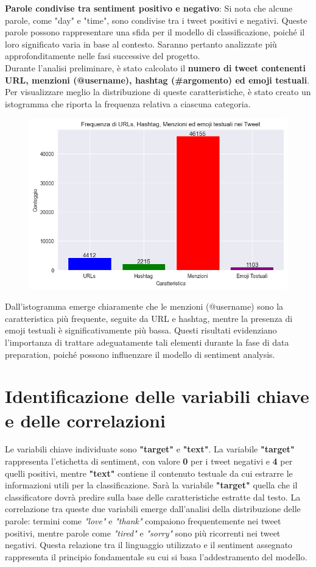 \documentclass[12pt,a4paper]{report} %
\begin{document}
\textbf{Parole condivise tra sentiment positivo e negativo}: Si nota che alcune parole, come "day" e "time", sono condivise tra i tweet positivi e negativi. Queste parole possono rappresentare una sfida per il modello di classificazione, poiché il loro significato varia in base al contesto. Saranno pertanto analizzate più approfonditamente nelle fasi successive del progetto.
\\Durante l'analisi preliminare, è stato calcolato il \textbf{n}\textbf{umero di tweet contenenti URL, menzioni (@username), hashtag (\#argomento) ed emoji testuali}. Per visualizzare meglio la distribuzione di queste caratteristiche, è stato creato un istogramma che riporta la frequenza relativa a ciascuna categoria. 
\begin{figure}[H]
    \centering
    \includegraphics[width=0.75\linewidth]{immagini/frequenza_tweet_understanding.png}
    \label{fig:enter-label}
\end{figure}
Dall'istogramma emerge chiaramente che le menzioni (@username) sono la caratteristica più frequente, seguite da URL e hashtag, mentre la presenza di emoji testuali è significativamente più bassa. Questi risultati evidenziano l'importanza di trattare adeguatamente tali elementi durante la fase di data preparation, poiché possono influenzare il modello di sentiment analysis. 
\section{Identificazione delle variabili chiave e delle correlazioni}
Le variabili chiave individuate sono \textbf{"target"} e \textbf{"text"}. La variabile \textbf{"target"} rappresenta l’etichetta di sentiment, con valore \textbf{0} per i tweet negativi e \textbf{4} per quelli positivi, mentre \textbf{"text"} contiene il contenuto testuale da cui estrarre le informazioni utili per la classificazione. Sarà la variabile \textbf{"target"} quella che il classificatore dovrà predire sulla base delle caratteristiche estratte dal testo. La correlazione tra queste due variabili emerge dall’analisi della distribuzione delle parole: termini come \textit{"love"} e \textit{"thank"} compaiono frequentemente nei tweet positivi, mentre parole come \textit{"tired"} e \textit{"sorry"} sono più ricorrenti nei tweet negativi. Questa relazione tra il linguaggio utilizzato e il sentiment assegnato rappresenta il principio fondamentale su cui si basa l’addestramento del modello. 
\end{document}
